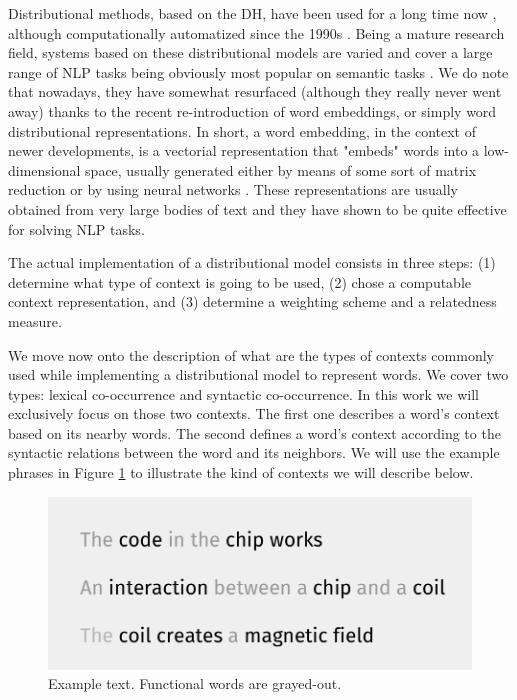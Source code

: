 Distributional methods, based on the DH, have been used for a long time now \cite{JurafskyM09}, although computationally automatized since the 1990s \cite{perinet2015}. Being a mature research field, systems based on these distributional models are varied and cover a large range of NLP tasks being obviously most popular on semantic tasks \cite{bruni2014multimodal}. We do note that nowadays, they have somewhat resurfaced (although they really never went away) thanks to the recent re-introduction of word embeddings, or simply word distributional representations. In short, a word embedding, in the context of newer developments, is a vectorial representation  that "embeds" words into a low-dimensional space, usually generated either by means of some sort of matrix reduction \cite{lebret2013deep,levy2014neural} or by using neural networks \cite{Collobert2011,mikolov2013distributed}. These representations are usually obtained from very large bodies of text and they have shown to be quite effective for solving NLP tasks.

The actual implementation of a distributional model consists in three steps: (1) determine what type of context is going to be used, (2) chose a computable context representation, and (3) determine a weighting scheme  and a  relatedness measure.

We move now onto the description of what are the types of contexts commonly used while implementing a distributional model to represent words.  We cover two types: lexical co-occurrence and syntactic co-occurrence. In this work we will exclusively focus on those two contexts. The first one describes a word's context based on its nearby words.  The second defines a word's context according to the syntactic relations between the word and its neighbors. We will use the example phrases in Figure \ref{fig:example_phrases} to illustrate the kind of contexts we will describe below. 
\begin{figure}
\centering
\includegraphics[width=0.7\linewidth]{images/Chapitre2/example_phrases.pdf}
\caption{Example text. Functional words are grayed-out. }
\label{fig:example_phrases}
\end{figure}

